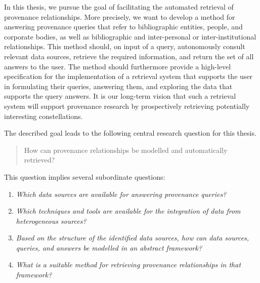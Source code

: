 In this thesis, we pursue the goal of facilitating
the automated retrieval of provenance relationships.
More precisely,
we want to develop a method for answering provenance queries that refer to bibliographic entities, people, and corporate bodies,
as well as bibliographic and inter-personal or inter-institutional relationships.
This method should, on input of a query,
autonomously consult relevant data sources,
retrieve the required information, and return the set of all answers to the user.
The method should furthermore provide a high-level specification
for the implementation of a retrieval system
that supports the user in formulating their queries, answering them, and exploring the data that supports the query answers.
It is our long-term vision that such a retrieval system will support provenance research
by prospectively retrieving potentially interesting constellations.

%

The described goal leads to the following
central research question for this thesis.
%
\begin{quote}
  \begin{itshape}
    How can provenance relationships be modelled and automatically retrieved?
  \end{itshape}
\end{quote}
%
This question implies several subordinate questions:
%
\begin{enumerate}
  \item[\subquestion{1}]
    \emph{Which data sources are available for answering provenance queries?}
  \item[\subquestion{2}]
    \emph{Which techniques and tools are available for the integration
    of data from heterogeneous sources?}
  \item[\subquestion{3}]
    \emph{Based on the structure of the identified data sources,
    how can data sources, queries, and answers be modelled in an abstract framework?}
  \item[\subquestion{4}]
    \emph{What is a suitable method for retrieving provenance relationships
    in that framework?}
\end{enumerate}



